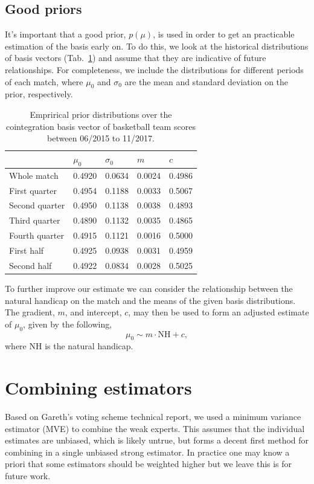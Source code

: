 \subsection{Good priors}
It's important that a good prior, $p(\mu)$, is used in order to get an
practicable estimation of the basis early on. To do this, we look at the
historical distributions of basis vectors (Tab.~\ref{tab:bbprior}) and assume
that they are indicative of future relationships. For completeness, we include
the distributions for different periods of each match, where $\mu_0$ and
$\sigma_0$ are the mean and standard deviation on the prior, respectively.
\begin{table}
    \centering
    \begin{tabular}{@{\textbf}lllll@{}}
        \toprule
        & $\mu_0$ & $\sigma_0$ & $m$    & $c$    \\
        \midrule
        Whole match    & 0.4920  & 0.0634     & 0.0024 & 0.4986 \\
        \midrule
        First quarter  & 0.4954  & 0.1188     & 0.0033 & 0.5067 \\
        Second quarter & 0.4950  & 0.1138     & 0.0038 & 0.4893 \\
        Third quarter  & 0.4890  & 0.1132     & 0.0035 & 0.4865 \\
        Fourth quarter & 0.4915  & 0.1121     & 0.0016 & 0.5000 \\
        \midrule
        First half     & 0.4925  & 0.0938     & 0.0031 & 0.4959 \\
        Second half    & 0.4922  & 0.0834     & 0.0028 & 0.5025 \\
        \bottomrule
    \end{tabular}

    \caption{Emprirical prior distributions over the cointegration basis vector
    of basketball team scores between 06/2015 to 11/2017.}\label{tab:bbprior}
\end{table}

To further improve our estimate we can consider the relationship between the
natural handicap on the match and the means of the given basis distributions.
The gradient, $m$, and intercept, $c$, may then be used to form an adjusted
estimate of $\mu_0$, given by the following,
\begin{equation}
    \mu_0 \sim m\cdot\textrm{NH} + c,
\end{equation}
where $\textrm{NH}$ is the natural handicap.

\section{Combining estimators}
Based on Gareth's voting scheme technical report, we used a minimum variance
estimator (MVE) to combine the weak experts. This assumes that the individual
estimates are unbiased, which is likely untrue, but forms a decent first method
for combining in a single unbiased strong estimator. In practice one may know a
priori that some estimators should be weighted higher but we leave this is for
future work.

